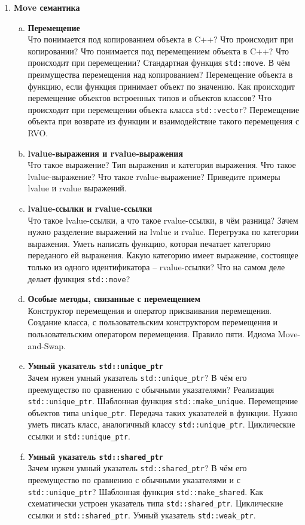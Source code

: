 \documentclass{article}
\begin{document}
\begin{enumerate}
\item \textbf{Move семантика}
\begin{enumerate}[a.]

\item \textbf{Перемещение}\\
Что понимается под копированием объекта в C++? Что происходит при копировании? Что понимается под перемещением объекта в C++? Что происходит при перемещении? Стандартная функция \texttt{std::move}. В чём преимущества перемещения над копированием? Перемещение объекта в функцию, если функция принимает объект по значению. Как происходит перемещение объектов встроенных типов и объектов классов? Что происходит при перемещении объекта класса \texttt{std::vector}? Перемещение объекта при возврате из функции и взаимодействие такого перемещения с RVO.


\item \textbf{lvalue-выражения и rvalue-выражения}\\
Что такое выражение? Тип выражения и категория выражения. Что такое lvalue-выражение? Что такое rvalue-выражение? Приведите примеры lvalue и rvalue выражений.


\item \textbf{lvalue-ссылки и rvalue-ссылки}\\
Что такое lvalue-ссылки, а что такое rvalue-ссылки, в чём разница? Зачем нужно разделение выражений на lvalue и rvalue. Перегрузка по категории выражения. Уметь написать функцию, которая печатает категорию переданого ей выражения. Какую категорию имеет выражение, состоящее только из одного идентификатора -- rvalue-ссылки? Что на самом деле делает функция \texttt{std::move}?

\item \textbf{Особые методы, связанные с перемещением}\\
Конструктор перемещения и оператор присваивания перемещения. Создание класса, с пользовательским конструктором перемещения и пользовательским оператором перемещения. Правило пяти. Идиома Move-and-Swap.

\item \textbf{Умный указатель \texttt{std::unique\_ptr}}\\
Зачем нужен умный указатель \texttt{std::unique\_ptr}? В чём его преемущество по сравнению с обычными указателями? Реализация \texttt{std::unique\_ptr}. Шаблонная функция \texttt{std::make\_unique}. Перемещение объектов типа \texttt{unique\_ptr}. Передача таких указателей в функции. Нужно уметь писать класс, аналогичный классу \texttt{std::unique\_ptr}. Циклические ссылки и \texttt{std::unique\_ptr}.

\item \textbf{Умный указатель \texttt{std::shared\_ptr}}\\
Зачем нужен умный указатель \texttt{std::shared\_ptr}? В чём его преемущество по сравнению с обычными указателями и с \texttt{std::unique\_ptr}? Шаблонная функция \texttt{std::make\_shared}. Как схематически устроен указатель типа \texttt{std::shared\_ptr}. Циклические ссылки и \texttt{std::shared\_ptr}. Умный указатель \texttt{std::weak\_ptr}.

\end{enumerate}
\end{enumerate}
\end{document}
